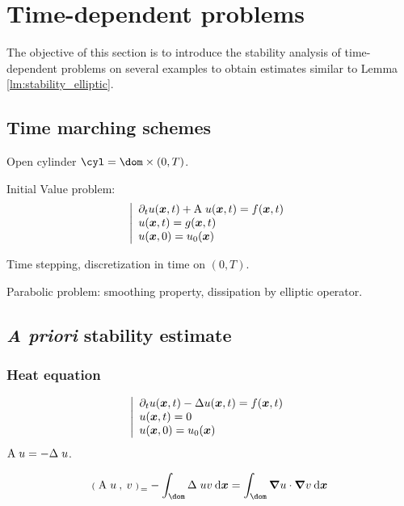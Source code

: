 
\chapter{Time-dependent problems}

The objective of this section is to introduce the \apriori stability analysis of time-dependent problems on several examples to obtain estimates similar to Lemma \ref{lm:stability_elliptic}.

\section{Time marching schemes}

Open cylinder $\cyl = \dom \times (0,T)$.

Initial Value problem:
\begin{equation*}
\left\lvert
\begin{array}{l}
\partial_t u({{\boldsymbol x}},t) + {\mathrm A}\;u({{\boldsymbol x}},t) = f({{\boldsymbol x}},t) \\
u({{\boldsymbol x}},t) = g({{\boldsymbol x}},t) \\
u({{\boldsymbol x}},0) = u_0({{\boldsymbol x}})
\end{array}
\right.
\end{equation*}

Time stepping, discretization in time on $(0,T)$.

Parabolic problem: smoothing property, dissipation by elliptic operator.

\section{\textit{A priori} stability estimate}

\subsection{Heat equation}

\begin{equation*}
\left\lvert
\begin{array}{l}
\partial_t u({{\boldsymbol x}},t) - \Delta u({{\boldsymbol x}},t) = f({{\boldsymbol x}},t) \\
u({{\boldsymbol x}},t) = 0 \\
u({{\boldsymbol x}},0) = u_0({{\boldsymbol x}})
\end{array}
\right.
\end{equation*}
${\mathrm A}\;u = - \Delta\;u$.

\begin{equation*}
\InnerP{\matA\;u}{v} = - \int_\dom \Delta\;u v \dxx = \int_\dom \Grad u \cdot \Grad v \dxx
\end{equation*}

